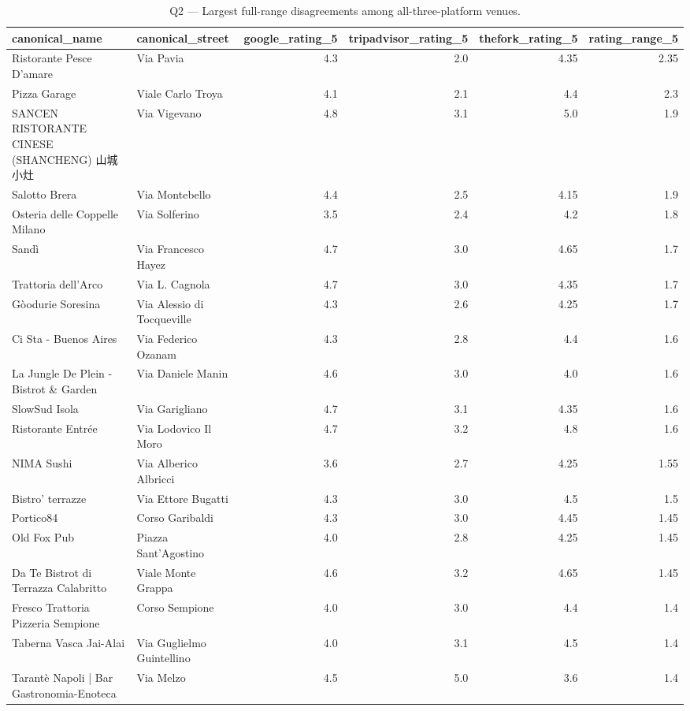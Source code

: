 \begin{table}[ht]
\centering
\caption{Q2 — Largest full-range disagreements among all-three-platform venues.}
\label{tab:q2_top_all_three}
{\tiny
\begin{tabular}{llrrrr}
\toprule
canonical\_name & canonical\_street & google\_rating\_5 & tripadvisor\_rating\_5 & thefork\_rating\_5 & rating\_range\_5 \\
\midrule
Ristorante Pesce D'amare & Via Pavia & 4.3 & 2.0 & 4.35 & 2.35 \\
Pizza Garage & Viale Carlo Troya & 4.1 & 2.1 & 4.4 & 2.3 \\
SANCEN RISTORANTE CINESE (SHANCHENG) 山城小灶 & Via Vigevano & 4.8 & 3.1 & 5.0 & 1.9 \\
Salotto Brera & Via Montebello & 4.4 & 2.5 & 4.15 & 1.9 \\
Osteria delle Coppelle Milano & Via Solferino & 3.5 & 2.4 & 4.2 & 1.8 \\
Sandì & Via Francesco Hayez & 4.7 & 3.0 & 4.65 & 1.7 \\
Trattoria dell'Arco & Via L. Cagnola & 4.7 & 3.0 & 4.35 & 1.7 \\
Gòodurie Soresina & Via Alessio di Tocqueville & 4.3 & 2.6 & 4.25 & 1.7 \\
Ci Sta - Buenos Aires & Via Federico Ozanam & 4.3 & 2.8 & 4.4 & 1.6 \\
La Jungle De Plein - Bistrot \& Garden & Via Daniele Manin & 4.6 & 3.0 & 4.0 & 1.6 \\
SlowSud Isola & Via Garigliano & 4.7 & 3.1 & 4.35 & 1.6 \\
Ristorante Entrée & Via Lodovico Il Moro & 4.7 & 3.2 & 4.8 & 1.6 \\
NIMA Sushi & Via Alberico Albricci & 3.6 & 2.7 & 4.25 & 1.55 \\
Bistro' terrazze & Via Ettore Bugatti & 4.3 & 3.0 & 4.5 & 1.5 \\
Portico84 & Corso Garibaldi & 4.3 & 3.0 & 4.45 & 1.45 \\
Old Fox Pub & Piazza Sant'Agostino & 4.0 & 2.8 & 4.25 & 1.45 \\
Da Te Bistrot di Terrazza Calabritto & Viale Monte Grappa & 4.6 & 3.2 & 4.65 & 1.45 \\
Fresco Trattoria Pizzeria Sempione & Corso Sempione & 4.0 & 3.0 & 4.4 & 1.4 \\
Taberna Vasca Jai-Alai & Via Guglielmo Guintellino & 4.0 & 3.1 & 4.5 & 1.4 \\
Tarantè Napoli | Bar Gastronomia-Enoteca & Via Melzo & 4.5 & 5.0 & 3.6 & 1.4 \\
\bottomrule
\end{tabular}
}
\end{table}
